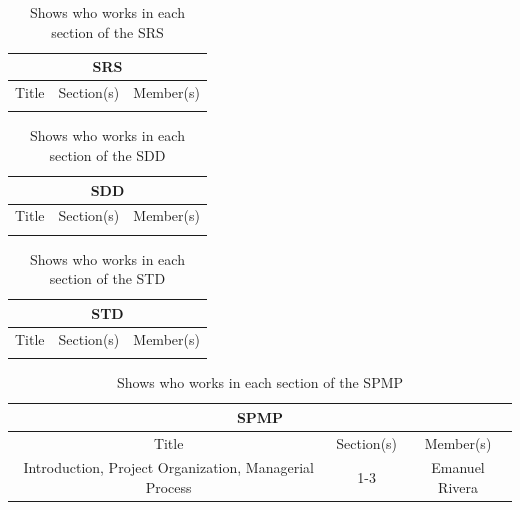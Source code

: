 \documentclass[12pt]{article}
\begin{document}
\begin{table}[H]\centering
\begin{tabular}{|c|c|c|}
  \hline
  \multicolumn{3}{|c|}{SRS} \\
  \hline
  Title & Section(s) & Member(s) \\
   \hline
    &  &  \\
   \hline
\end{tabular}
\caption{Shows who works in each section of the SRS}
\label{RespSRS}
\end{table}

\begin{table}[H]\centering
\begin{tabular}{|c|c|c|}
  \hline
  \multicolumn{3}{|c|}{SDD} \\
  \hline
  Title & Section(s) & Member(s) \\
   \hline
    &  &  \\
   \hline
\end{tabular}
\caption{Shows who works in each section of the SDD}
\label{RespSDD}
\end{table}

\begin{table}[H]\centering
\begin{tabular}{|c|c|c|}
  \hline
  \multicolumn{3}{|c|}{STD} \\
  \hline
  Title & Section(s) & Member(s) \\
   \hline
    &  &  \\
   \hline
\end{tabular}
\caption{Shows who works in each section of the STD}
\label{RespSTD}
\end{table}

\begin{table}[H]\centering
\begin{tabular}{|c|c|c|}
  \hline
  \multicolumn{3}{|c|}{SPMP} \\
  \hline
  Title & Section(s) & Member(s) \\
   \hline
   Introduction, Project Organization, Managerial Process & 1-3  & Emanuel Rivera \\
   \hline
\end{tabular}
\caption{Shows who works in each section of the SPMP}
\label{RespSPMP}
\end{table}
\end{document}
